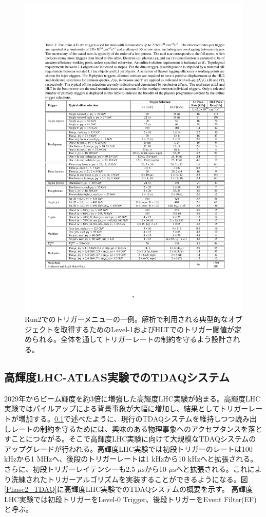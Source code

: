 \begin{figure} 
\centering
\includegraphics[width=16cm]{fig/Intro/Run2_Triggermenu.pdf}
\caption[Run2でのトリガーメニューの一例]{Run2でのトリガーメニューの一例\cite{Run2_Triggermenu}。解析で利用される典型的なオブジェクトを取得するためのLevel-1およびHLTでのトリガー閾値が定められる。全体を通してトリガーレートの制約を守るよう設計される。}
\label{Run2_Triggermenu}
\end{figure}

\subsection{高輝度LHC-ATLAS実験でのTDAQシステム}
2029年からビーム輝度を約3倍に増強した高輝度LHC実験が始まる。高輝度LHC実験ではパイルアップによる背景事象が大幅に増加し、結果としてトリガーレートが増加する。\ref{}で述べたように、現行のTDAQシステムを維持しつつ読み出しレートの制約を守るためには、興味のある物理事象へのアクセプタンスを落とすことにつながる。そこで高輝度LHC実験に向けて大規模なTDAQシステムのアップグレードが行われる。高輝度LHC実験では初段トリガーのレートは100 kHzから1 MHzへ、後段のトリガーレートは1 kHzから10 kHzへと拡張される。さらに、初段トリガーレイテンシーも2.5 $\mu\mathrm{s}$から10 $\mu\mathrm{s}$へと拡張される。これにより洗練されたトリガーアルゴリズムを実装することができるようになる。図\ref{Phase2_TDAQ}に高輝度LHC実験でのTDAQシステムの概要を示す。
高輝度LHC実験では初段トリガーをLevel-0 Trigger、後段トリガーをEvent Filter(EF)と呼ぶ。

